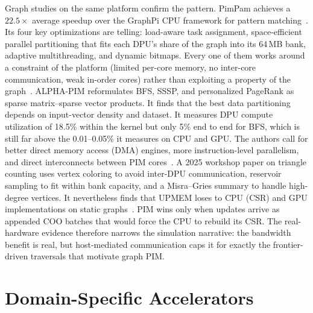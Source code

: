 \documentclass[journal,onecolumn]{IEEEtran}
\begin{document}
Graph studies on the same platform confirm the pattern. PimPam achieves a $22.5\times$ average speedup over the GraphPi CPU framework for pattern matching~\cite{cai2024pimpam}. Its four key optimizations are telling: load-aware task assignment, space-efficient parallel partitioning that fits each DPU's share of the graph into its 64\,MB bank, adaptive multithreading, and dynamic bitmaps. Every one of them works around a constraint of the platform (limited per-core memory, no inter-core communication, weak in-order cores) rather than exploiting a property of the graph~\cite{cai2024pimpam}. ALPHA-PIM reformulates BFS, SSSP, and personalized PageRank as sparse matrix--sparse vector products. It finds that the best data partitioning depends on input-vector density and dataset. It measures DPU compute utilization of 18.5\% within the kernel but only 5\% end to end for BFS, which is still far above the 0.01--0.05\% it measures on CPU and GPU. The authors call for better direct memory access (DMA) engines, more instruction-level parallelism, and direct interconnects between PIM cores~\cite{barkhordar2025alphapim}. A 2025 workshop paper on triangle counting uses vertex coloring to avoid inter-DPU communication, reservoir sampling to fit within bank capacity, and a Misra--Gries summary to handle high-degree vertices. It nevertheless finds that UPMEM loses to CPU (CSR) and GPU implementations on static graphs~\cite{asquini2025tc}. PIM wins only when updates arrive as appended COO batches that would force the CPU to rebuild its CSR. The real-hardware evidence therefore narrows the simulation narrative: the bandwidth benefit is real, but host-mediated communication caps it for exactly the frontier-driven traversals that motivate graph PIM.

\section{Domain-Specific Accelerators}\label{sec:dsa}
\end{document}
